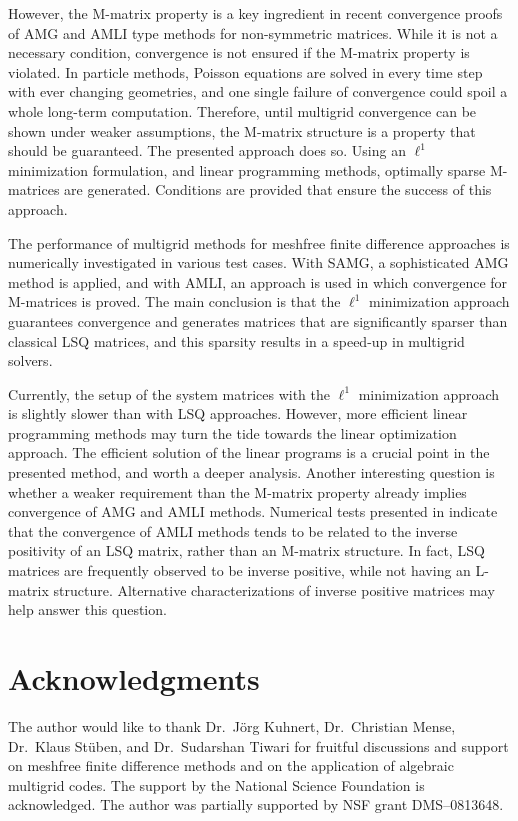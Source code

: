 \documentclass[reqno]{amsart}
\theoremstyle{plain}
\theoremstyle{definition}
\theoremstyle{remark}
\begin{document}
However, the M-matrix property is a key ingredient in recent convergence proofs of
AMG and AMLI type methods for non-symmetric matrices. While it is not a necessary
condition, convergence is not ensured if the M-matrix property is violated. In particle
methods, Poisson equations are solved in every time step with ever changing geometries,
and one single failure of convergence could spoil a whole long-term computation.
Therefore, until multigrid convergence can be shown under weaker assumptions, the
M-matrix structure is a property that should be guaranteed. The presented approach
does so. Using an $\ell^1$ minimization formulation, and linear programming methods,
optimally sparse M-matrices are generated. Conditions are provided that ensure the
success of this approach.

The performance of multigrid methods for meshfree finite difference approaches is
numerically investigated in various test cases. With SAMG, a sophisticated AMG method
is applied, and with AMLI, an approach is used in which convergence for M-matrices is
proved. The main conclusion is that the $\ell^1$ minimization approach guarantees
convergence and generates matrices that are significantly sparser than classical LSQ
matrices, and this sparsity results in a speed-up in multigrid solvers.

Currently, the setup of the system matrices with the $\ell^1$ minimization approach
is slightly slower than with LSQ approaches. However, more efficient linear programming
methods may turn the tide towards the linear optimization approach. The efficient solution
of the linear programs is a crucial point in the presented method, and worth a deeper
analysis. Another interesting question is whether a weaker requirement than the
M-matrix property already implies convergence of AMG and AMLI methods.
Numerical tests presented in \cite{SeiboldDiss2006} indicate that the convergence
of AMLI methods tends to be related to the inverse positivity of an LSQ matrix,
rather than an M-matrix structure. In fact, LSQ matrices are frequently observed
to be inverse positive, while not having an L-matrix structure. Alternative
characterizations of inverse positive matrices \cite{FujimotoRanade2004} may help
answer this question.

\section*{Acknowledgments}
The author would like to thank Dr.~J{\"o}rg Kuhnert, Dr.~Christian Mense,
Dr.~Klaus St{\"u}ben, and Dr.~Sudarshan Tiwari
for fruitful discussions and support on meshfree finite difference methods
and on the application of algebraic multigrid codes.
The support by the National Science Foundation is acknowledged.
The author was partially supported by NSF grant DMS--0813648.



\end{document}
